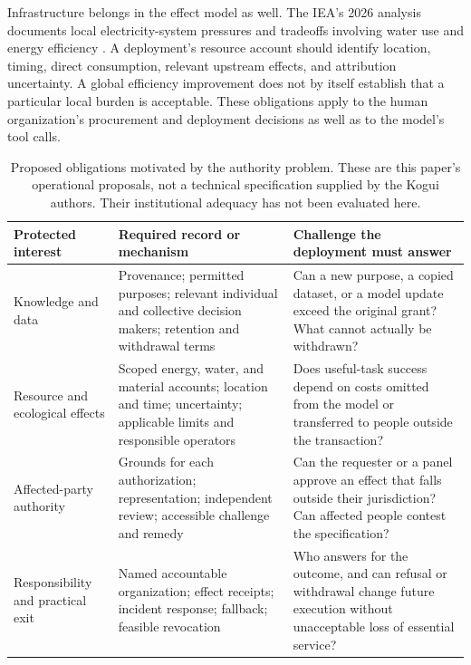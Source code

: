 \documentclass[10pt,twocolumn,letterpaper]{article}
\begin{document}
Infrastructure belongs in the effect model as well. The IEA's 2026 analysis documents local electricity-system pressures and tradeoffs involving water use and energy efficiency \cite{iea}. A deployment's resource account should identify location, timing, direct consumption, relevant upstream effects, and attribution uncertainty. A global efficiency improvement does not by itself establish that a particular local burden is acceptable. These obligations apply to the human organization's procurement and deployment decisions as well as to the model's tool calls.

\begin{table}[t]
\centering\small
\setlength{\tabcolsep}{4pt}
\begin{tabularx}{\textwidth}{@{}P{.17\textwidth}LL@{}}
\toprule
\textbf{Protected interest} & \textbf{Required record or mechanism} & \textbf{Challenge the deployment must answer}\\
\midrule
Knowledge and data & Provenance; permitted purposes; relevant individual and collective decision makers; retention and withdrawal terms & Can a new purpose, a copied dataset, or a model update exceed the original grant? What cannot actually be withdrawn?\\
Resource and ecological effects & Scoped energy, water, and material accounts; location and time; uncertainty; applicable limits and responsible operators & Does useful-task success depend on costs omitted from the model or transferred to people outside the transaction?\\
Affected-party authority & Grounds for each authorization; representation; independent review; accessible challenge and remedy & Can the requester or a panel approve an effect that falls outside their jurisdiction? Can affected people contest the specification?\\
Responsibility and practical exit & Named accountable organization; effect receipts; incident response; fallback; feasible revocation & Who answers for the outcome, and can refusal or withdrawal change future execution without unacceptable loss of essential service?\\
\bottomrule
\end{tabularx}
\caption{Proposed obligations motivated by the authority problem. These are this paper's operational proposals, not a technical specification supplied by the Kogui authors. Their institutional adequacy has not been evaluated here.}
\label{tab:legitimacy}
\end{table}
\end{document}
